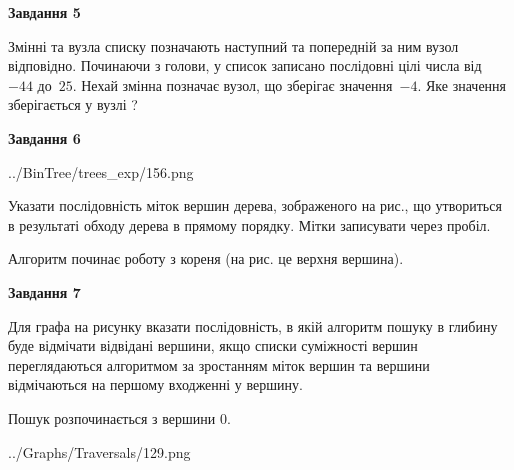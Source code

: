 \documentclass[12pt, ukrainian]{article}
\begin{document}
{\begin {large}
{\begin {center}\textbf{Завдання 5}\end {center}}\par
Змінні  та  вузла списку позначають наступний та попередній за ним вузол відповідно. Починаючи з голови, у список записано послідовні цілі числа від~$-44$ до~$25$. Нехай змінна  позначає вузол, що зберігає значення~$-4$.
Яке значення зберігається у вузлі  ?\par
\newpage

{\begin {center}\textbf{Завдання 6}\end {center}}\par

\begin{center}
	{../BinTree/trees_exp/156.png}
\end{center}
Указати послідовність міток вершин дерева, зображеного на рис., що утвориться в результаті обходу дерева в прямому порядку. Мітки записувати через пробіл.\par Алгоритм починає роботу з кореня (на рис. це верхня вершина).\par
\newpage

{\begin {center}\textbf{Завдання 7}\end {center}}\par
Для графа на рисунку вказати послідовність, в якій алгоритм пошуку в глибину буде відмічати відвідані вершини, якщо списки суміжності вершин переглядаються алгоритмом за зростанням міток вершин та вершини відмічаються на першому вход\-женні у вершину.\par
Пошук розпочинається з вершини 0.\par

\begin{center}
	{../Graphs/Traversals/129.png}
\end{center}\par
\newpage


\end{large}}
\end{document}

